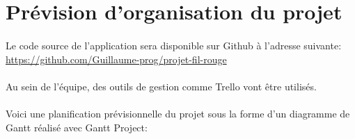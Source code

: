 \documentclass[../main.tex]{subfiles}
\begin{document}
    \section{Prévision d'organisation du projet}
    \paragraph{}
    Le code source de l’application sera disponible sur Github à l’adresse suivante: \url{https://github.com/Guillaume-prog/projet-fil-rouge}

    \paragraph{}
    Au sein de l’équipe, des outils de gestion comme Trello vont être utilisés.

    \paragraph{}
    Voici une planification prévisionnelle du projet sous la forme d’un diagramme de Gantt réalisé avec Gantt Project:
\end{document}
